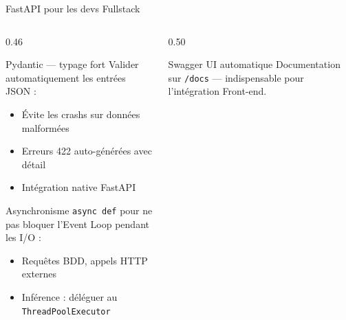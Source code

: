 \documentclass[aspectratio=169, 10pt]{beamer}
\begin{document}
\begin{frame}{FastAPI pour les devs Fullstack}
  \begin{columns}[T]
    \begin{column}{0.46\textwidth}
      \begin{block}{Pydantic --- typage fort}
        Valider automatiquement les entrées JSON :
        \begin{itemize}
          \item Évite les crashs sur données malformées
          \item Erreurs 422 auto-générées avec détail
          \item Intégration native FastAPI
        \end{itemize}
      \end{block}
      \smallskip
      \begin{block}{Asynchronisme}
        \texttt{async def} pour ne pas bloquer
        l'Event Loop pendant les I/O :
        \begin{itemize}
          \item Requêtes BDD, appels HTTP externes
          \item Inférence : déléguer au
                \texttt{ThreadPoolExecutor}
        \end{itemize}
      \end{block}
    \end{column}
    \begin{column}{0.50\textwidth}
      \begin{exampleblock}{Swagger UI automatique}
        Documentation sur \texttt{/docs} ---
        indispensable pour l'intégration Front-end.
        \vspace{4pt}
        \begin{center}
\end{center}
\end{exampleblock}
\end{column}
\end{columns}
\end{frame}
\end{document}
